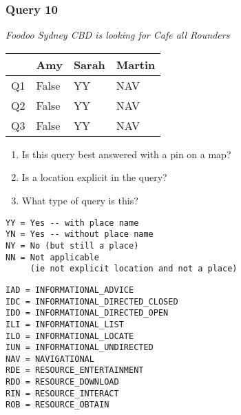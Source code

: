 \begin{frame}[fragile]
\frametitle{Query 10}
\vspace{1em}

\emph{Foodoo Sydney CBD is looking for Cafe all Rounders}

\vfill

\begin{table}
  \centering
  \begin{tabular}{ l l l l }
    & \textbf{Amy} & \textbf{Sarah} & \textbf{Martin}\\
    \toprule
    Q1 & False & YY & NAV\\
Q2 & False & YY & NAV\\
Q3 & False & YY & NAV\\
    \bottomrule
  \end{tabular}
\end{table}

\vfill

\tiny{

\begin{enumerate}
\item Is this query best answered with a pin on a map?
\item Is a location explicit in the query?
\item What type of query is this?
\end{enumerate}

\vfill

\begin{multicols}{2}
\begin{verbatim}
YY = Yes -- with place name
YN = Yes -- without place name
NY = No (but still a place)
NN = Not applicable 
     (ie not explicit location and not a place)
\end{verbatim}

\columnbreak
\begin{verbatim}
IAD = INFORMATIONAL_ADVICE
IDC = INFORMATIONAL_DIRECTED_CLOSED
IDO = INFORMATIONAL_DIRECTED_OPEN
ILI = INFORMATIONAL_LIST
ILO = INFORMATIONAL_LOCATE
IUN = INFORMATIONAL_UNDIRECTED
NAV = NAVIGATIONAL
RDE = RESOURCE_ENTERTAINMENT
RDO = RESOURCE_DOWNLOAD
RIN = RESOURCE_INTERACT
ROB = RESOURCE_OBTAIN
\end{verbatim}
\end{multicols}
}

\end{frame}


